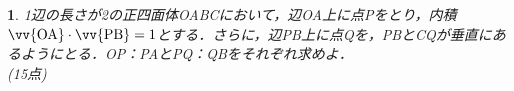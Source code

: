 \documentclass[9pt,
b4paper,
fleqn,
dvipdfmx,
uplatex
]{jsarticle}
\newtheorem{question}[Question]{}
\newcommand{\bqu}{\begin{question}}
\newcommand{\equ}{\end{question}}
\newcommand{\benu}{\begin{enumerate}}
\newcommand{\eenu}{\end{enumerate}}
\newcommand{\bb}{\bf\boldmath}%
\renewcommand{\dlim}{\displaystyle\lim}
\newenvironment{解答}{
\hspace{-2zw}\phkasen<linethickness=7pt,iro=mygray,kasenUehosei=-3pt>{\bf \large \ 解答\ }\vspace{-1zw}\begin{leftbbar}}{\end{leftbbar}}
\newenvironment{leftbbar}{%
\def\FrameCommand{\color{mygray} \vrule width 5pt \hspace{1zw}
\color{black}}%
\MakeFramed {\advance\hsize-\width \FrameRestore}}%
{\endMakeFramed}
\begin{document}

\newpage

\bqu%
1辺の長さが2の正四面体OABCにおいて，辺OA上に点Pをとり，内積$\vv
{\text{OA}}\cdot \vv{\text{PB}}=1$とする．さらに，辺PB上に点Qを，PBとCQが垂直にあるようにとる．OP：PAとPQ：QBをそれぞれ求めよ．\\\hfill (15点)
\equ
\end{document}
